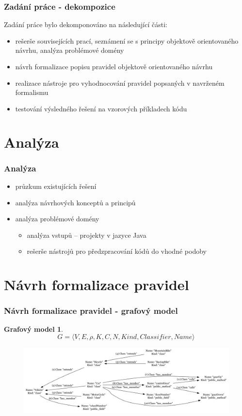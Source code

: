 \documentclass{beamer}
\newtheorem*{graphmodel}{Grafový model}
\begin{document}
\begin{frame}
  \frametitle{Zadání práce - dekompozice}
  Zadání práce bylo dekomponováno na následující části:
  \begin{itemize}
  \item rešerše souvisejících prací, seznámení se s principy objektově orientovaného návrhu, analýza problémové domény
  \item návrh formalizace popisu pravidel objektově orientovaného návrhu
  \item realizace nástroje pro vyhodnocování pravidel popsaných v navrženém formalismu
  \item testování výsledného řešení na vzorových příkladech kódu
  \end{itemize}
\end{frame}

\section{Analýza}
\begin{frame}
  \frametitle{Analýza}
  \begin{itemize}
  \item průzkum existujících řešení
  \item analýza návrhových konceptů a principů
  \item analýza problémové domény
    \begin{itemize}
    \item analýza vstupů -- projekty v jazyce Java
    \item rešerše nástrojů pro předzpracování kódů do vhodné podoby
    \end{itemize}
  \end{itemize}
\end{frame}

\section{Návrh formalizace pravidel}
\begin{frame}
  \frametitle{Návrh formalizace pravidel - grafový model}
  \begin{graphmodel}
    \begin{displaymath}
      G = \langle V, E, \rho, K, C, N, \mathit{Kind}, \mathit{Classifier}, \mathit{Name}\rangle
    \end{displaymath}
  \end{graphmodel}
    \begin{figure}[h!]
      \centering
      \includegraphics[width=1.0\textwidth]{../thesis/graphs/graph_example.png}
    \end{figure}
\end{frame}
\end{document}
